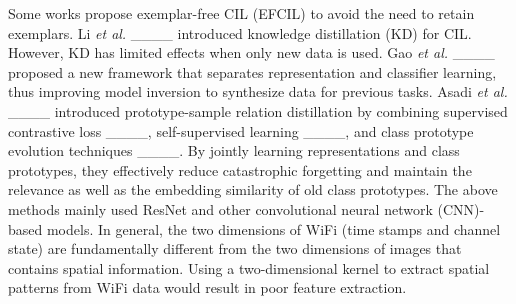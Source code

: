 Some works propose exemplar-free CIL (EFCIL) to avoid the need to retain exemplars.
Li \textit{et al.} ____ introduced knowledge distillation (KD) for CIL.
However, KD has limited effects when only new data is used.
Gao \textit{et al.} ____ proposed a new framework that separates representation and classifier learning, thus improving model inversion to synthesize data for previous tasks.
Asadi \textit{et al.} ____ introduced prototype-sample relation distillation by combining supervised contrastive loss ____, self-supervised learning ____, and class prototype evolution techniques ____. 
By jointly learning representations and class prototypes, they effectively reduce catastrophic forgetting and maintain the relevance as well as the embedding similarity of old class prototypes.
The above methods mainly used ResNet and other convolutional neural network (CNN)-based models.
In general, the two dimensions of WiFi (time stamps and channel state) are fundamentally different from the two dimensions of images that contains spatial information.
Using a two-dimensional kernel to extract spatial patterns from WiFi data would result in poor feature extraction.


